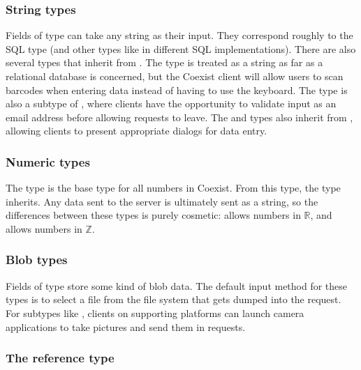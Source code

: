 \subsubsection{String types}  \label{sec:type_string}
Fields of type  can take any string as their input. They correspond
roughly to the  SQL type (and other types like  in different SQL
implementations). There are also several types that inherit from .
The  type is treated as a string as far as a relational database is
concerned, but the Coexist client will allow users to scan barcodes when
entering data instead of having to use the keyboard. The  type is
also a subtype of , where clients have the opportunity to validate
input as an email address before allowing requests to leave. The  and
 types also inherit from , allowing clients to
present appropriate dialogs for data entry.



\subsubsection{Numeric types}  \label{sec:type_num}

The  type is the base type for all numbers in Coexist. From this
type, the  type inherits. Any data sent to the server is ultimately
sent as a string, so the differences between these types is purely cosmetic:
 allows numbers in $\mathbb{R}$, and  allows numbers in
$\mathbb{Z}$. 


\subsubsection{Blob types}  \label{sec:type_blob}

Fields of type  store some kind of blob data. The default input method
for these types is to select a file from the file system that gets dumped into
the request. For subtypes like , clients on supporting platforms can
launch camera applications to take pictures and send them in requests.


\subsubsection{The reference type}  \label{sec:type_reference}

